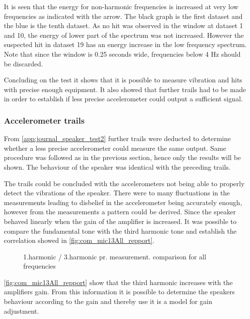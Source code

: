 
%


It is seen that the energy for non-harmonic frequencies is increased at very low frequencies as indicated with the arrow. The black graph is the first dataset and the blue is the tenth dataset. As no hit was observed in the window at dataset 1 and 10, the energy of lower part of the spectrum was not increased. However the suspected hit in dataset 19 has an energy increase in the low frequency spectrum. Note that since the window is 0.25 seconds wide, frequencies below 4 Hz should be discarded.

Concluding on the test it shows that it is possible to measure vibration and hits with precise enough equipment. It also showed that further trails had to be made in order to establish if less precise accelerometer could output a sufficient signal.

\subsubsection{Accelerometer trails}

From \autoref{app:journal_speaker_test2} further trails were deducted to determine whether a less precise accelerometer could measure the same output. Same procedure was followed as in the previous section, hence only the results will be shown. The behaviour of the speaker was identical with the preceding trails. 

The trails could be concluded with the accelerometers not being able to properly detect the vibrations of the speaker. There were to many fluctuations in the measurements leading to disbelief in the accelerometer being accurately enough, however from the measurements a pattern could be derived. Since the speaker behaved linearly when the gain of the amplifier is increased. It was possible to compare the fundamental tone with the third harmonic tone and establish the correlation showed in \autoref{fig:com_mic13All_repport}.

\begin{figure}[H]
    \centering
    
    \caption{1.harmonic / 3.harmonic pr. measurement. comparison for all frequencies}
\label{fig:com_mic13All_repport}
\end{figure}  

\autoref{fig:com_mic13All_repport} show that the third harmonic increases with the amplifiers gain. From this information it is possible to determine the speakers behaviour according to the gain and thereby use it is a model for gain adjustment.


